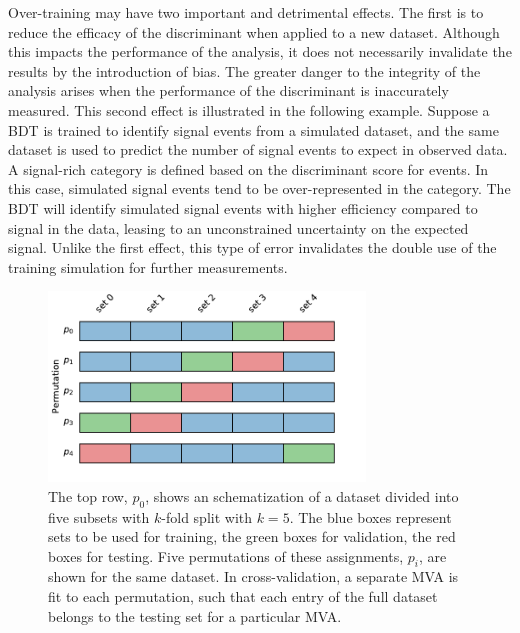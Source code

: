 Over-training may have two important and detrimental effects.
The first is to reduce the efficacy of the discriminant when applied to a new dataset.
Although this impacts the performance of the analysis, it does not necessarily invalidate the results by the introduction of bias.
The greater danger to the integrity of the analysis arises when the performance of the discriminant is inaccurately measured.
This second effect is illustrated in the following example.
Suppose a BDT is trained to identify signal events from a simulated dataset, and the same dataset is used to predict the number of signal events to expect in observed data.
A signal-rich category is defined based on the discriminant score for events.
In this case, simulated signal events tend to be over-represented in the category.
The BDT will identify simulated signal events with higher efficiency compared to signal in the data, leasing to an unconstrained uncertainty on the expected signal.
Unlike the first effect, this type of error invalidates the double use of the training simulation for further measurements.

\begin{figure}[h!]
\captionsetup[subfigure]{position=b}
\centering
\includegraphics[width=0.75\textwidth]{figures/hmm/testTrainVal.pdf}
\caption{The top row, $p_0$, shows an schematization of a dataset divided into five subsets with $k$-fold split with $k=5$.
The blue boxes represent sets to be used for training, the green boxes for validation, the red boxes for testing.
Five permutations of these assignments, $p_i$, are shown for the same dataset.
In cross-validation, a separate MVA is fit to each permutation, such that each entry of the full dataset belongs to the testing set for a particular MVA.
}
\label{fig:testTrainVal}
\end{figure}


